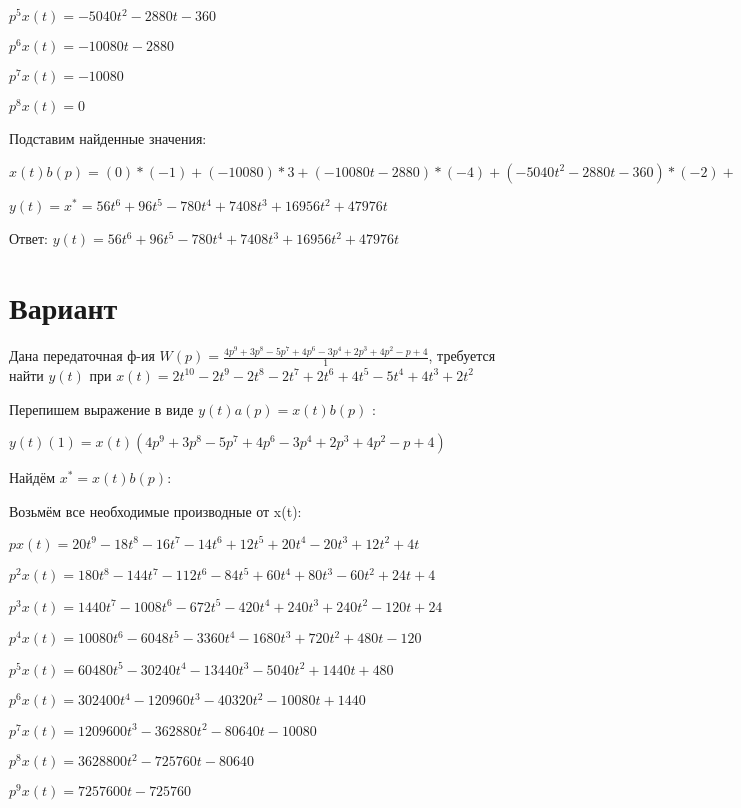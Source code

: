 \documentclass{article}
\begin{document}
{{{$p^5x(t)=-5040t^{2}-2880t-360$

$p^6x(t)=-10080t-2880$

$p^7x(t)=-10080$

$p^8x(t)=0$

Подставим найденные значения:

$x(t)b(p) = (0)*(-1)+(-10080)*3+(-10080t-2880)*(-4)+(-5040t^{2}-2880t-360)*(-2)+(-1680t^{3}-1440t^{2}-360t+48)*(-5)+(-420t^{4}-480t^{3}-180t^{2}+48t-18)*2+(-14t^{6}-24t^{5}-15t^{4}+8t^{3}-9t^{2}+2)*(-2)+(-14t^{6}-24t^{5}-15t^{4}+8t^{3}-9t^{2}+2)*(-2)=56t^{6}+96t^{5}-780t^{4}+7408t^{3}+16956t^{2}+47976t$





$y(t)=x^*=56t^{6}+96t^{5}-780t^{4}+7408t^{3}+16956t^{2}+47976t$

Ответ: $y(t) = 56t^{6}+96t^{5}-780t^{4}+7408t^{3}+16956t^{2}+47976t$

\section{Вариант}

Дана передаточная ф-ия $W(p)=\frac{4p^{9}+3p^{8}-5p^{7}+4p^{6}-3p^{4}+2p^{3}+4p^{2}-p+4}{1}$, требуется найти $y(t)$ при $x(t)=2t^{10}-2t^{9}-2t^{8}-2t^{7}+2t^{6}+4t^{5}-5t^{4}+4t^{3}+2t^{2}$

Перепишем выражение в виде $y(t)a(p)=x(t)b(p)$ :

$y(t)(1)=x(t)(4p^{9}+3p^{8}-5p^{7}+4p^{6}-3p^{4}+2p^{3}+4p^{2}-p+4)$

Найдём $x^*=x(t)b(p)$:

Возьмём все необходимые производные от x(t):

$px(t)=20t^{9}-18t^{8}-16t^{7}-14t^{6}+12t^{5}+20t^{4}-20t^{3}+12t^{2}+4t$

$p^2x(t)=180t^{8}-144t^{7}-112t^{6}-84t^{5}+60t^{4}+80t^{3}-60t^{2}+24t+4$

$p^3x(t)=1440t^{7}-1008t^{6}-672t^{5}-420t^{4}+240t^{3}+240t^{2}-120t+24$

$p^4x(t)=10080t^{6}-6048t^{5}-3360t^{4}-1680t^{3}+720t^{2}+480t-120$

$p^5x(t)=60480t^{5}-30240t^{4}-13440t^{3}-5040t^{2}+1440t+480$

$p^6x(t)=302400t^{4}-120960t^{3}-40320t^{2}-10080t+1440$

$p^7x(t)=1209600t^{3}-362880t^{2}-80640t-10080$

$p^8x(t)=3628800t^{2}-725760t-80640$

$p^9x(t)=7257600t-725760$

}}}
\end{document}
